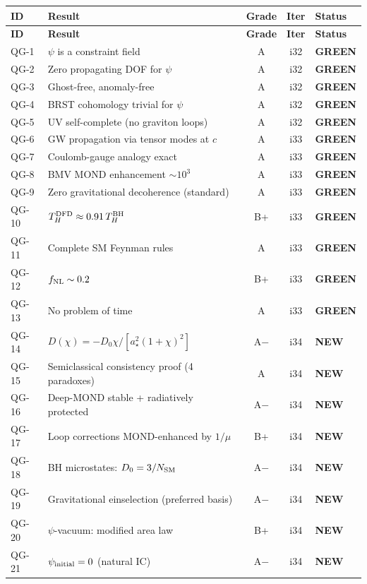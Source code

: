 \documentclass[11pt,a4paper]{article}
\newcommand{\GREEN}{\textcolor{dfdgreen}{\textbf{GREEN}}}
\newcommand{\NEW}{\textcolor{dfdblue}{\textbf{NEW}}}
\begin{document}
\begin{center}
\begin{longtable}{lp{4.5cm}ccl}
\toprule
\textbf{ID} & \textbf{Result} & \textbf{Grade} & \textbf{Iter} & \textbf{Status} \\
\midrule
\endfirsthead
\toprule
\textbf{ID} & \textbf{Result} & \textbf{Grade} & \textbf{Iter} & \textbf{Status} \\
\midrule
\endhead
\bottomrule
\endlastfoot
QG-1 & $\psi$ is a constraint field & A & i32 & \GREEN \\
QG-2 & Zero propagating DOF for $\psi$ & A & i32 & \GREEN \\
QG-3 & Ghost-free, anomaly-free & A & i32 & \GREEN \\
QG-4 & BRST cohomology trivial for $\psi$ & A & i32 & \GREEN \\
QG-5 & UV self-complete (no graviton loops) & A & i32 & \GREEN \\
QG-6 & GW propagation via tensor modes at $c$ & A & i33 & \GREEN \\
QG-7 & Coulomb-gauge analogy exact & A & i33 & \GREEN \\
QG-8 & BMV MOND enhancement $\sim 10^3$ & A & i33 & \GREEN \\
QG-9 & Zero gravitational decoherence (standard) & A & i33 & \GREEN \\
QG-10 & $T_H^{\rm DFD} \approx 0.91\,T_H^{\rm BH}$ & B+ & i33 & \GREEN \\
QG-11 & Complete SM Feynman rules & A & i33 & \GREEN \\
QG-12 & $f_{\rm NL} \sim 0.2$ & B+ & i33 & \GREEN \\
QG-13 & No problem of time & A & i33 & \GREEN \\
QG-14 & $D(\chi) = -D_0\chi/[a_\star^2(1+\chi)^2]$ & A$-$ & i34 & \NEW \\
QG-15 & Semiclassical consistency proof (4 paradoxes) & A & i34 & \NEW \\
QG-16 & Deep-MOND stable + radiatively protected & A$-$ & i34 & \NEW \\
QG-17 & Loop corrections MOND-enhanced by $1/\mu$ & B+ & i34 & \NEW \\
QG-18 & BH microstates: $D_0 = 3/N_{\rm SM}$ & A$-$ & i34 & \NEW \\
QG-19 & Gravitational einselection (preferred basis) & A$-$ & i34 & \NEW \\
QG-20 & $\psi$-vacuum: modified area law & B+ & i34 & \NEW \\
QG-21 & $\psi_{\rm initial} = 0$ (natural IC) & A$-$ & i34 & \NEW \\

\end{longtable}
\end{center}
\end{document}

